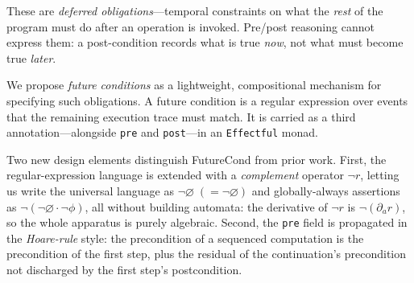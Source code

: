 \documentclass[acmsmall,screen]{acmart}
\newcommand{\univ}{\neg\varnothing}
\begin{document}
These are \emph{deferred obligations}---temporal constraints on what the
\emph{rest} of the program must do after an operation is invoked.
Pre/post reasoning cannot express them: a post-condition records what is
true \emph{now}, not what must become true \emph{later}.

We propose \emph{future conditions} as a lightweight, compositional
mechanism for specifying such obligations.
A future condition is a regular expression over events that the remaining
execution trace must match.
It is carried as a third annotation---alongside \lstinline{pre} and
\lstinline{post}---in an \lstinline{Effectful} monad.

Two new design elements distinguish FutureCond from prior work.
First, the regular-expression language is extended with a
\emph{complement} operator $\neg r$, letting us write the universal
language as $\univ\;(=\neg\varnothing)$ and globally-always assertions
as $\neg(\univ\cdot\neg\phi)$, all without building automata:
the derivative of $\neg r$ is $\neg(\partial_a r)$, so the whole
apparatus is purely algebraic.
Second, the \lstinline{pre} field is propagated in the
\emph{Hoare-rule} style: the precondition of a sequenced computation
is the precondition of the first step, plus the residual of the
continuation's precondition not discharged by the first step's
postcondition.
\end{document}
